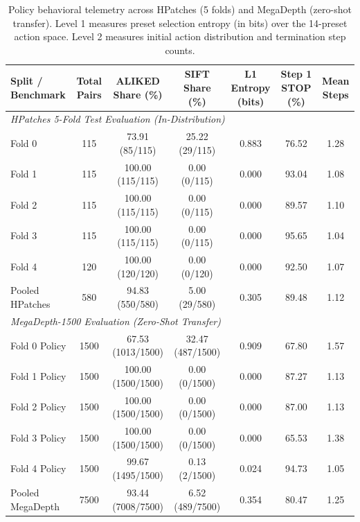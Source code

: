 \begin{table}[t]
\centering
\caption{Policy behavioral telemetry across HPatches (5 folds) and MegaDepth (zero-shot transfer). Level 1 measures preset selection entropy (in bits) over the 14-preset action space. Level 2 measures initial action distribution and termination step counts.}
\label{tab:policy_behaviour}
\small
\begin{tabular}{lcccccc}
\hline
\textbf{Split / Benchmark} & \textbf{Total Pairs} & \textbf{ALIKED Share (\%)} & \textbf{SIFT Share (\%)} & \textbf{L1 Entropy (bits)} & \textbf{Step 1 STOP (\%)} & \textbf{Mean Steps} \\
\hline
\multicolumn{7}{l}{\textit{HPatches 5-Fold Test Evaluation (In-Distribution)}} \\
Fold 0 & 115 & 73.91 (85/115) & 25.22 (29/115) & 0.883 & 76.52 & 1.28 \\
Fold 1 & 115 & 100.00 (115/115) & 0.00 (0/115) & 0.000 & 93.04 & 1.08 \\
Fold 2 & 115 & 100.00 (115/115) & 0.00 (0/115) & 0.000 & 89.57 & 1.10 \\
Fold 3 & 115 & 100.00 (115/115) & 0.00 (0/115) & 0.000 & 95.65 & 1.04 \\
Fold 4 & 120 & 100.00 (120/120) & 0.00 (0/120) & 0.000 & 92.50 & 1.07 \\
Pooled HPatches & 580 & 94.83 (550/580) & 5.00 (29/580) & 0.305 & 89.48 & 1.12 \\
\hline
\multicolumn{7}{l}{\textit{MegaDepth-1500 Evaluation (Zero-Shot Transfer)}} \\
Fold 0 Policy & 1500 & 67.53 (1013/1500) & 32.47 (487/1500) & 0.909 & 67.80 & 1.57 \\
Fold 1 Policy & 1500 & 100.00 (1500/1500) & 0.00 (0/1500) & 0.000 & 87.27 & 1.13 \\
Fold 2 Policy & 1500 & 100.00 (1500/1500) & 0.00 (0/1500) & 0.000 & 87.00 & 1.13 \\
Fold 3 Policy & 1500 & 100.00 (1500/1500) & 0.00 (0/1500) & 0.000 & 65.53 & 1.38 \\
Fold 4 Policy & 1500 & 99.67 (1495/1500) & 0.13 (2/1500) & 0.024 & 94.73 & 1.05 \\
Pooled MegaDepth & 7500 & 93.44 (7008/7500) & 6.52 (489/7500) & 0.354 & 80.47 & 1.25 \\
\hline
\end{tabular}
\end{table}
